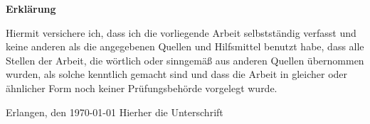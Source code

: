 \documentclass[12pt,oneside,ngerman,reqno,a4paper]{article}
\begin{document}





\clearpage\thispagestyle{empty}



\begin{center}\textbf{\large Erklärung}\end{center}

\noindent
Hiermit versichere ich, dass ich die vorliegende Arbeit selbstständig verfasst
und keine anderen als die angegebenen Quellen und Hilfsmittel benutzt habe,
dass alle Stellen der Arbeit, die wörtlich oder sinngemäß aus anderen Quellen
übernommen wurden, als solche kenntlich gemacht sind und dass die Arbeit in
gleicher oder ähnlicher Form noch keiner Prüfungsbehörde vorgelegt wurde.

\vspace{4\baselineskip}

\noindent
Erlangen, den \today \hspace*{2cm} Hierher die Unterschrift


\clearpage

\end{document}
